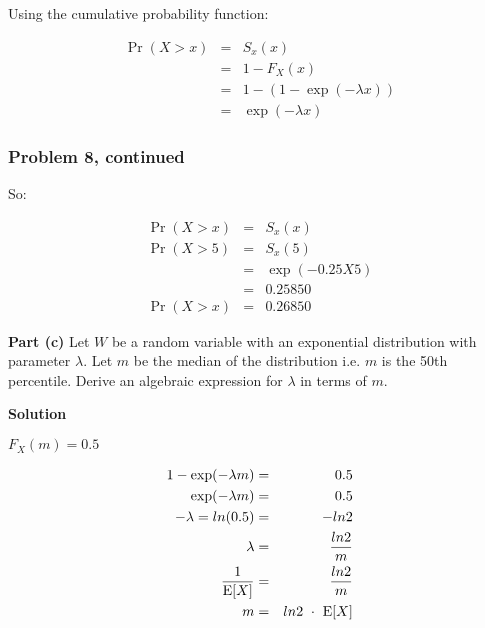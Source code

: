 \documentclass[12pt]{article}
\theoremstyle{definition}
\begin{document}
Using the cumulative probability function:

\begin{eqnarray*}
\Pr(X > x) & = & S_x(x) \\
& = & 1 - F_X(x) \\
& = & 1 - (1 - \exp(-\lambda x)) \\
& = & \exp(- \lambda x)
\end{eqnarray*}

\newpage
\subsubsection*{Problem 8, continued}

So:

\begin{eqnarray*}
\Pr(X > x) & = & S_x(x) \\
\Pr(X > 5) & = & S_x(5) \\
& = & \exp(-0.25 X 5) \\
& = & 0.25850 \\
\Pr(X > x) & = & 0.26850
\end{eqnarray*}

\vspace{2in}
\noindent
{\bf Part (c)} Let $W$ be a random variable with an exponential distribution with parameter $\lambda$. Let $m$ be the median of the distribution i.e. $m$ is the 50th percentile. Derive an algebraic expression for $\lambda$ in terms of $m$.

\bigskip
\noindent
{\bf Solution}

$F_X(m) = 0.5$


\begin{eqnarray*}
1 - \exp(-\lambda m) & = & 0.5 \\
\exp(-\lambda m) & = & 0.5 \\
- \lambda = ln(0.5) & = & -ln 2 \\
\lambda & = & \frac{ln 2}{m} \\
\frac{1}{\hbox{E}[X]} & = &  \frac{ln 2}{m} \\
m & = & ln 2 \ \cdot \ \hbox{E}[X] \\
\end{eqnarray*}
\end{document}
